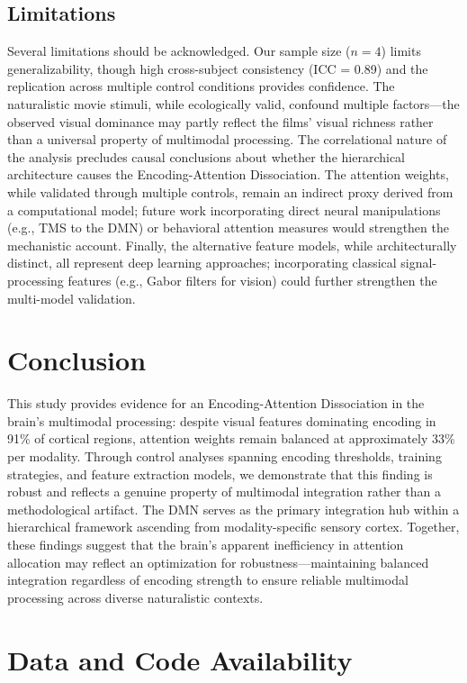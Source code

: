 \documentclass[conference]{IEEEtran}
\begin{document}
\subsection{Limitations}

Several limitations should be acknowledged. Our sample size ($n = 4$) limits generalizability, though high cross-subject consistency (ICC = 0.89) and the replication across multiple control conditions provides confidence. The naturalistic movie stimuli, while ecologically valid, confound multiple factors---the observed visual dominance may partly reflect the films' visual richness rather than a universal property of multimodal processing. The correlational nature of the analysis precludes causal conclusions about whether the hierarchical architecture causes the Encoding-Attention Dissociation. The attention weights, while validated through multiple controls, remain an indirect proxy derived from a computational model; future work incorporating direct neural manipulations (e.g., TMS to the DMN) or behavioral attention measures would strengthen the mechanistic account. Finally, the alternative feature models, while architecturally distinct, all represent deep learning approaches; incorporating classical signal-processing features (e.g., Gabor filters for vision) could further strengthen the multi-model validation.

\section{Conclusion}

This study provides evidence for an Encoding-Attention Dissociation in the brain's multimodal processing: despite visual features dominating encoding in 91\% of cortical regions, attention weights remain balanced at approximately 33\% per modality. Through control analyses spanning encoding thresholds, training strategies, and feature extraction models, we demonstrate that this finding is robust and reflects a genuine property of multimodal integration rather than a methodological artifact. The DMN serves as the primary integration hub within a hierarchical framework ascending from modality-specific sensory cortex. Together, these findings suggest that the brain's apparent inefficiency in attention allocation may reflect an optimization for robustness---maintaining balanced integration regardless of encoding strength to ensure reliable multimodal processing across diverse naturalistic contexts.

\section{Data and Code Availability}
\end{document}
